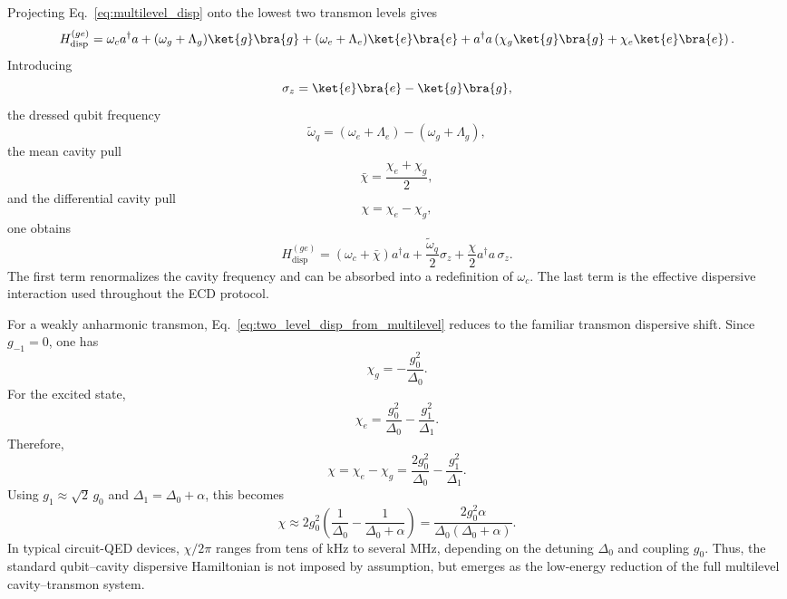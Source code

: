 Projecting Eq.~\eqref{eq:multilevel_disp} onto the lowest two transmon levels gives
\begin{equation}
    H_{\mathrm{disp}}^{(ge)}
    =
    \omega_c a^\dagger a
    +
    (\omega_g+\Lambda_g)\ket{g}\bra{g}
    +
    (\omega_e+\Lambda_e)\ket{e}\bra{e}
    +
    a^\dagger a
    \left(
        \chi_g \ket{g}\bra{g}
        +
        \chi_e \ket{e}\bra{e}
    \right).
\end{equation}
Introducing
\begin{equation}
    \sigma_z = \ket{e}\bra{e} - \ket{g}\bra{g},
\end{equation}
the dressed qubit frequency
\begin{equation}
    \tilde{\omega}_q
    =
    (\omega_e+\Lambda_e)-(\omega_g+\Lambda_g),
\end{equation}
the mean cavity pull
\begin{equation}
    \bar{\chi} = \frac{\chi_e+\chi_g}{2},
\end{equation}
and the differential cavity pull
\begin{equation}
    \chi = \chi_e-\chi_g,
\end{equation}
one obtains
\begin{equation}
    H_{\mathrm{disp}}^{(ge)}
    =
    (\omega_c+\bar{\chi})a^\dagger a
    +
    \frac{\tilde{\omega}_q}{2}\sigma_z
    +
    \frac{\chi}{2}a^\dagger a\,\sigma_z.
    \label{eq:two_level_disp_from_multilevel}
\end{equation}
The first term renormalizes the cavity frequency and can be absorbed into a redefinition of \(\omega_c\). The last term is the effective dispersive interaction used throughout the ECD protocol.

For a weakly anharmonic transmon, Eq.~\eqref{eq:two_level_disp_from_multilevel} reduces to the familiar transmon dispersive shift. Since \(g_{-1}=0\), one has
\begin{equation}
    \chi_g = -\frac{g_0^2}{\Delta_0}.
\end{equation}
For the excited state,
\begin{equation}
    \chi_e = \frac{g_0^2}{\Delta_0} - \frac{g_1^2}{\Delta_1}.
\end{equation}
Therefore,
\begin{equation}
    \chi
    =
    \chi_e-\chi_g
    =
    \frac{2g_0^2}{\Delta_0} - \frac{g_1^2}{\Delta_1}.
\end{equation}
Using \(g_1 \approx \sqrt{2}\,g_0\) and \(\Delta_1=\Delta_0+\alpha\), this becomes
\begin{equation}
    \chi
    \approx
    2g_0^2
    \left(
        \frac{1}{\Delta_0}
        -
        \frac{1}{\Delta_0+\alpha}
    \right)
    =
    \frac{2g_0^2 \alpha}{\Delta_0(\Delta_0+\alpha)}.
\end{equation}
In typical circuit-QED devices, \(\chi/2\pi\) ranges from tens of kHz to several MHz, depending on the detuning \(\Delta_0\) and coupling \(g_0\). Thus, the standard qubit--cavity dispersive Hamiltonian is not imposed by assumption, but emerges as the low-energy reduction of the full multilevel cavity--transmon system.

